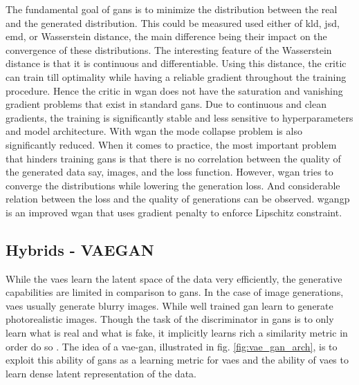 

The fundamental goal of \acp{gan} is to minimize the distribution between the real and the generated distribution. This could be measured used either of \ac{kld}, \ac{jsd}, \ac{emd}, or Wasserstein distance, the main difference being their impact on the convergence of these distributions. The interesting feature of the Wasserstein distance is that it is continuous and differentiable. Using this distance, the critic can train till optimality while having a reliable gradient throughout the training procedure. Hence the critic in \ac{wgan} does not have the saturation and vanishing gradient problems that exist in standard \acp{gan}. Due to continuous and clean gradients, the training is significantly stable and less sensitive to hyperparameters and model architecture. With \ac{wgan} the mode collapse problem is also significantly reduced. When it comes to practice, the most important problem that hinders training \acp{gan} is that there is no correlation between the quality of the generated data say, images, and the loss function. However, \ac{wgan} tries to converge the distributions while lowering the generation loss. And considerable relation between the loss and the quality of generations can be observed. \ac{wgangp} \cite{wgangp} is an improved \ac{wgan} that uses gradient penalty to enforce Lipschitz constraint.

\subsection{Hybrids - VAEGAN}
\label{subsec:vaeganhybrid}
While the \acp{vae} learn the latent space of the data very efficiently, the generative capabilities are limited in comparison to \acp{gan}. In the case of image generations, \acp{vae} usually generate blurry images. While well trained \ac{gan} learn to generate photorealistic images. Though the task of the discriminator in \acp{gan} is to only learn what is real and what is fake, it implicitly learns rich a similarity metric in order do so \cite{autoencoding_beyond_pixels}. The idea of a \ac{vae}-\ac{gan}, illustrated in fig. \ref{fig:vae_gan_arch}, is to exploit this ability of \acp{gan} as a learning metric for \acp{vae} and the ability of \acp{vae} to learn dense latent representation of the data.

